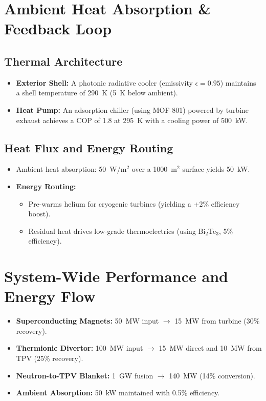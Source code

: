 \documentclass[12pt]{article}
\begin{document}
\section{Ambient Heat Absorption \& Feedback Loop}
\subsection{Thermal Architecture}
\begin{itemize}
    \item \textbf{Exterior Shell:} A photonic radiative cooler (emissivity $\epsilon = 0.95$) maintains a shell temperature of 290~K (5~K below ambient).
    \item \textbf{Heat Pump:} An adsorption chiller (using MOF-801) powered by turbine exhaust achieves a COP of 1.8 at 295~K with a cooling power of 500~kW.
\end{itemize}

\subsection{Heat Flux and Energy Routing}
\begin{itemize}
    \item Ambient heat absorption: 50~W/m$^2$ over a 1000~m$^2$ surface yields 50~kW.
    \item \textbf{Energy Routing:}
    \begin{itemize}
        \item Pre-warms helium for cryogenic turbines (yielding a +2\% efficiency boost).
        \item Residual heat drives low-grade thermoelectrics (using Bi$_2$Te$_3$, 5\% efficiency).
    \end{itemize}
\end{itemize}

\section{System-Wide Performance and Energy Flow}
\begin{itemize}
    \item \textbf{Superconducting Magnets:} 50~MW input $\rightarrow$ 15~MW from turbine (30\% recovery).
    \item \textbf{Thermionic Divertor:} 100~MW input $\rightarrow$ 15~MW direct and 10~MW from TPV (25\% recovery).
    \item \textbf{Neutron-to-TPV Blanket:} 1~GW fusion $\rightarrow$ 140~MW (14\% conversion).
    \item \textbf{Ambient Absorption:} 50~kW maintained with 0.5\% efficiency.
\end{itemize}
\end{document}
